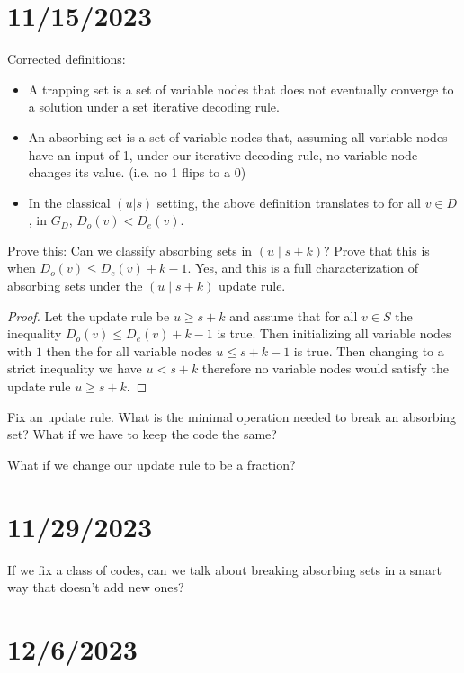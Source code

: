 \documentclass{article}
\begin{document}
\section*{11/15/2023}

Corrected definitions:
\begin{itemize}
    \item A trapping set is a set of variable nodes that does not eventually converge to a solution under a set iterative decoding rule.
    \item An absorbing set is a set of variable nodes that, assuming all variable nodes have an input of 1, under our iterative decoding rule, no variable node changes its value. (i.e. no 1 flips to a 0)
    \item In the classical $(u|s)$ setting, the above definition translates to for all $v \in D$, in $G_D$, $D_o(v) < D_e(v)$.
\end{itemize}

Prove this: Can we classify absorbing sets in $(u \mid s+k)$? Prove that this is when $D_o(v) \leq D_e(v) + k-1$. Yes, and this is a full characterization of absorbing sets under the $(u \mid s+k)$ update rule.

\begin{proof}
    Let the update rule be   $u\geq s+k$ and assume that for all $v\in S$ the inequality $D_o(v)\leq D_e(v)+k-1$ is true. Then initializing all variable nodes with $1$ then the for all variable nodes $u\leq s+k-1$ is true. Then changing to a strict inequality we have $u< s+k$ therefore no variable nodes would satisfy the update rule $u\geq s+k$.
\end{proof}



Fix an update rule. What is the minimal operation needed to break an absorbing set? What if we have to keep the code the same?

What if we change our update rule to be a fraction?

\section*{11/29/2023}





If we fix a class of codes, can we talk about breaking absorbing sets in a smart way that doesn't add new ones?


\section*{12/6/2023}
\end{document}
